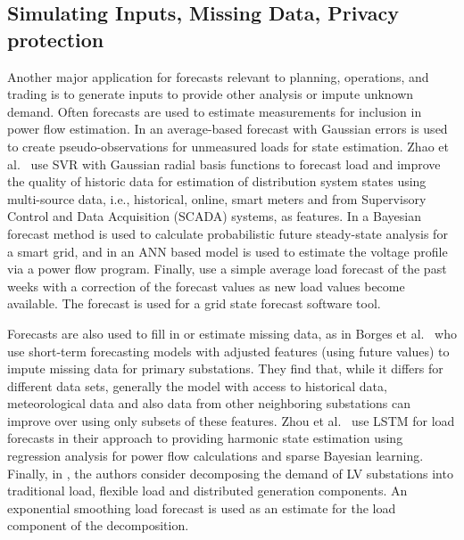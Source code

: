 \subsection{Simulating Inputs, Missing Data, Privacy protection}
\label{otherapps}
Another major application for forecasts relevant to planning, operations, and trading is to generate inputs to provide other analysis or impute unknown demand. Often forecasts are used to estimate measurements for inclusion in power flow estimation. In \cite{Korres2011SEI} an average-based forecast with Gaussian errors is used to create pseudo-observations for unmeasured loads for state estimation. Zhao et al.~\cite{zhao2020rmv} use SVR with Gaussian radial basis functions to forecast load and improve the quality of historic data for estimation of distribution system states using multi-source data, i.e., historical, online, smart meters and from Supervisory Control and Data Acquisition (SCADA) systems, as features. In \cite{Bracale2013ABB} a Bayesian forecast method is used to calculate probabilistic future steady-state analysis for a smart grid, and in \cite{Chessmore2008VPE} an ANN based model is used to estimate the voltage profile via a power flow program. Finally, \cite{hermanns2020eod} use a simple average load forecast of the past weeks with a correction of the forecast values as new load values become available. The forecast is used for a grid state forecast software tool.

Forecasts are also used to fill in or estimate missing data, as in Borges et al.~\cite{borges2020etm} who use short-term forecasting models with adjusted features (using future values) to impute missing data for primary substations. They find that, while it differs for different data sets, generally the model with access to historical data, meteorological data and also data from other neighboring substations can improve over using only subsets of these features. Zhou et al.~\cite{zhou2020blb} use LSTM for load forecasts in their approach to providing harmonic state estimation using regression analysis for power flow calculations and sparse Bayesian learning. Finally, in \cite{wang2020rnl}, the authors consider decomposing the demand of LV substations into traditional load, flexible load and distributed generation components. An exponential smoothing load forecast is used as an estimate for the load component of the decomposition. 

